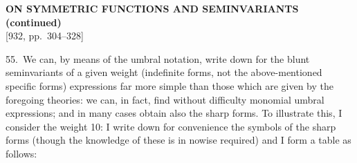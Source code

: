 \documentclass[11pt]{article}
\begin{document}
\setcounter{page}{304}

\begin{center}
{\large\bfseries ON SYMMETRIC FUNCTIONS AND SEMINVARIANTS (continued)}\\[0.4em]
{\small [932, pp.\ 304--328]}
\end{center}
\vspace{0.4em}

55.\ We can, by means of the umbral notation, write down for the blunt seminvariants of a given weight (indefinite forms, not the above-mentioned specific forms) expressions far more simple than those which are given by the foregoing theories: we can, in fact, find without difficulty monomial umbral expressions; and in many cases obtain also the sharp forms. To illustrate this, I consider the weight 10: I write down for convenience the symbols of the sharp forms (though the knowledge of these is in nowise required) and I form a table as follows:
\end{document}
